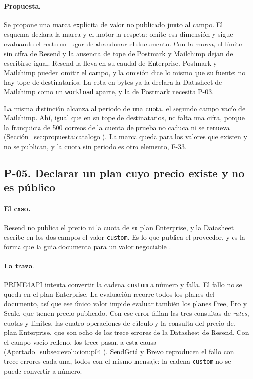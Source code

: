 \paragraph{Propuesta.}
Se propone una marca explícita de valor no publicado junto al campo.
El esquema declara la marca y el motor la respeta: omite esa dimensión y sigue evaluando el resto en lugar de abandonar el documento.
Con la marca, el límite sin cifra de Resend y la ausencia de tope de Postmark y Mailchimp dejan de escribirse igual.
Resend la lleva en su caudal de Enterprise.
Postmark y Mailchimp pueden omitir el campo, y la omisión dice lo mismo que su fuente: no hay tope de destinatarios.
La cota en bytes ya la declara la Datasheet de Mailchimp como un \texttt{workload} aparte, y la de Postmark necesita P-03.

La misma distinción alcanza al periodo de una cuota, el segundo campo vacío de Mailchimp.
Ahí, igual que en su tope de destinatarios, no falta una cifra, porque la franquicia de 500 correos de la cuenta de prueba no caduca ni se renueva (Sección~\ref{sec:propuesta:catalogo}).
La marca queda para los valores que existen y no se publican, y la cuota sin periodo es otro elemento, F-33.

\subsection{P-05. Declarar un plan cuyo precio existe y no es público}
\label{subsec:evolucion:p05}

\paragraph{El caso.}
Resend no publica el precio ni la cuota de su plan Enterprise, y la Datasheet escribe en los dos campos el valor \texttt{custom}.
Es lo que publica el proveedor, y es la forma que la guía documenta para un valor negociable \citep{apisconsumptionmodel}.

\paragraph{La traza.}
PRIME4API intenta convertir la cadena \texttt{custom} a número y falla.
El fallo no se queda en el plan Enterprise.
La evaluación recorre todos los planes del documento, así que ese único valor impide evaluar también los planes Free, Pro y Scale, que tienen precio publicado.
Con ese error fallan las tres consultas de \textit{rates}, cuotas y límites, las cuatro operaciones de cálculo y la consulta del precio del plan Enterprise, que son ocho de los trece errores de la Datasheet de Resend.
Con el campo vacío relleno, los trece pasan a esta causa (Apartado~\ref{subsec:evolucion:p04}).
SendGrid y Brevo reproducen el fallo con trece errores cada una, todos con el mismo mensaje: la cadena \texttt{custom} no se puede convertir a número.

